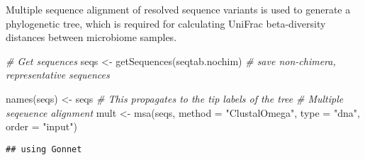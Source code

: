 \documentclass[
]{article}
\newenvironment{Shaded}{\begin{snugshade}}{\end{snugshade}}
\newcommand{\AttributeTok}[1]{\textcolor[rgb]{0.77,0.63,0.00}{#1}}
\newcommand{\CommentTok}[1]{\textcolor[rgb]{0.56,0.35,0.01}{\textit{#1}}}
\newcommand{\FunctionTok}[1]{\textcolor[rgb]{0.00,0.00,0.00}{#1}}
\newcommand{\NormalTok}[1]{#1}
\newcommand{\OtherTok}[1]{\textcolor[rgb]{0.56,0.35,0.01}{#1}}
\newcommand{\StringTok}[1]{\textcolor[rgb]{0.31,0.60,0.02}{#1}}
\begin{document}
Multiple sequence alignment of resolved sequence variants is used to
generate a phylogenetic tree, which is required for calculating UniFrac
beta-diversity distances between microbiome samples.

\begin{Shaded}
\begin{Highlighting}[]
\CommentTok{\# Get sequences}
\NormalTok{seqs }\OtherTok{\textless{}{-}} \FunctionTok{getSequences}\NormalTok{(seqtab.nochim)}
\CommentTok{\# save non{-}chimera, representative sequences}


\FunctionTok{names}\NormalTok{(seqs) }\OtherTok{\textless{}{-}}\NormalTok{ seqs  }\CommentTok{\# This propagates to the tip labels of the tree}
\CommentTok{\# Multiple seqeuence alignment}
\NormalTok{mult }\OtherTok{\textless{}{-}} \FunctionTok{msa}\NormalTok{(seqs, }\AttributeTok{method =} \StringTok{"ClustalOmega"}\NormalTok{, }\AttributeTok{type =} \StringTok{"dna"}\NormalTok{, }\AttributeTok{order =} \StringTok{"input"}\NormalTok{)}
\end{Highlighting}
\end{Shaded}

\begin{verbatim}
## using Gonnet
\end{verbatim}
\end{document}
